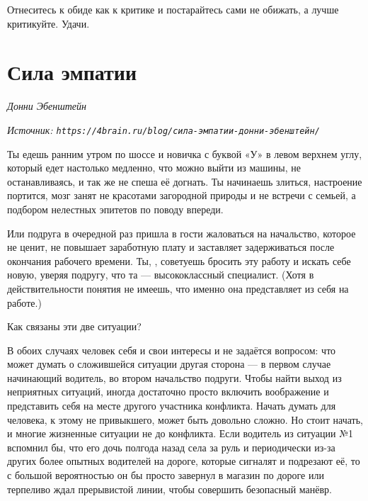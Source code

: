 Отнеситесь к обиде как к критике и постарайтесь сами не обижать, а лучше критикуйте. Удачи.



\newpage
\section{Сила эмпатии}

\textit{Донни Эбенштейн}

\textit{Источник: \texttt{https://4brain.ru/blog/сила-эмпатии-донни-эбенштейн/}}

Ты едешь ранним  утром по шоссе и  новичка с буквой «У» в левом верхнем углу, который едет настолько медленно, что можно выйти из машины, не останавливаясь, и так же не спеша её догнать. Ты начинаешь злиться, настроение портится, мозг занят не  красотами загородной природы и не  встречи с семьей, а подбором нелестных эпитетов по поводу  впереди.

Или подруга в очередной раз пришла в гости жаловаться на начальство, которое не ценит, не повышает заработную плату и заставляет задерживаться после окончания рабочего времени. Ты, , советуешь бросить эту работу и искать себе новую, уверяя подругу, что та --- высококлассный специалист. (Хотя в действительности понятия не имеешь, что именно она представляет из себя на работе.)

\begin{center}
    \Large
    Как связаны эти две ситуации?
\end{center}

В обоих случаях человек  себя и свои интересы и не задаётся вопросом: что может думать о сложившейся ситуации другая сторона --- в первом случае начинающий водитель, во втором начальство подруги. Чтобы найти выход из неприятных ситуаций, иногда достаточно просто включить воображение и представить себя на месте другого участника конфликта. Начать думать  для человека, к этому не привыкшего, может быть довольно сложно. Но стоит начать, и многие жизненные ситуации не  до конфликта. Если водитель из ситуации №1 вспомнил бы, что его дочь полгода назад села за руль и периодически  из-за  других более опытных водителей на дороге, которые сигналят и подрезают её, то с большой вероятностью он бы просто завернул в магазин по дороге или терпеливо ждал прерывистой линии, чтобы совершить безопасный манёвр.

